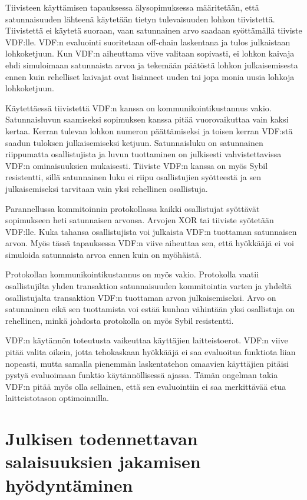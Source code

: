Tiivisteen käyttämisen tapauksessa älysopimuksessa määritetään, että satunnaisuuden lähteenä käytetään tietyn tulevaisuuden lohkon tiivistettä. Tiivistettä ei käytetä suoraan, vaan satunnainen arvo saadaan syöttämällä tiiviste VDF:lle. VDF:n evaluointi suoritetaan off-chain laskentana ja tulos julkaistaan lohkoketjuun. Kun VDF:n aiheuttama viive valitaan sopivasti, ei lohkon kaivaja ehdi simuloimaan satunnaista arvoa ja tekemään päätöstä lohkon julkaisemisesta ennen kuin rehelliset kaivajat ovat lisänneet uuden tai jopa monia uusia lohkoja lohkoketjuun.

Käytettäessä tiivistettä VDF:n kanssa on kommunikointikustannus vakio. Satunnaisluvun saamiseksi sopimuksen kanssa pitää vuorovaikuttaa vain kaksi kertaa. Kerran tulevan lohkon numeron päättämiseksi ja toisen kerran VDF:stä saadun tuloksen julkaisemiseksi ketjuun. Satunnaisluku on satunnainen riippumatta osallistujista ja luvun tuottaminen on julkisesti vahvistettavissa VDF:n ominaisuuksien mukaisesti. Tiiviste VDF:n kanssa on myös Sybil resistentti, sillä satunnainen luku ei riipu osallistujien syötteestä ja sen julkaisemiseksi tarvitaan vain yksi rehellinen osallistuja.

Parannellussa kommitoinnin protokollassa kaikki osallistujat syöttävät sopimukseen heti satunnaisen arvonsa. Arvojen XOR tai tiiviste syötetään VDF:lle. Kuka tahansa osallistujista voi julkaista VDF:n tuottaman satunnaisen arvon. Myös tässä tapauksessa VDF:n viive aiheuttaa sen, että hyökkääjä ei voi simuloida satunnaista arvoa ennen kuin on myöhäistä. 

Protokollan kommunikointikustannus on myös vakio. Protokolla vaatii osallistujilta yhden transaktion satunnaisuuden kommitointia varten ja yhdeltä osallistujalta transaktion VDF:n tuottaman arvon julkaisemiseksi. Arvo on satunnainen eikä sen tuottamista voi estää kunhan vähintään yksi osallistuja on rehellinen, minkä johdosta protokolla on myös Sybil resistentti.

VDF:n käytännön toteutusta vaikeuttaa käyttäjien laitteistoerot. VDF:n viive pitää valita oikein, jotta tehokaskaan hyökkääjä ei saa evaluoitua funktiota liian nopeasti, mutta samalla pienemmän laskentatehon omaavien käyttäjien pitäisi pystyä evaluoimaan funktio käytännöllisessä ajassa. Tämän ongelman takia VDF:n pitää myös olla sellainen, että sen evaluointiin ei saa merkittävää etua laitteistotason optimoinnilla.

\section{Julkisen todennettavan salaisuuksien jakamisen hyödyntäminen}

